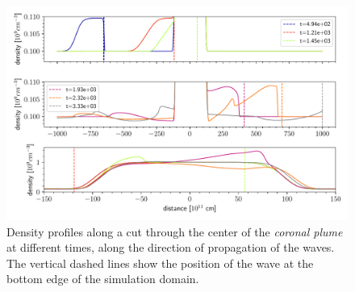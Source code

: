 \begin{figure}[H]
	\centering
	\includegraphics[width=\linewidth]{images/plume-sections.pdf}
	\caption{Density profiles along a cut through the center of the \emph{coronal plume} at different times, along the direction of propagation of the waves.
	The vertical dashed lines show the position of the wave at the bottom edge of the simulation domain.}
	\label{fig:plume-sections}
\end{figure}

